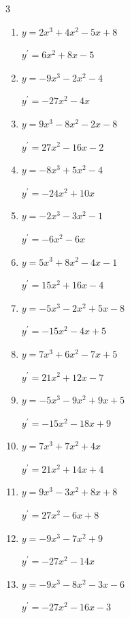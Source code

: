 \begin{multicols}{3}
\begin{enumerate}
  \item $y=2x^{3}+4x^{2}-5x+8$

        $\displaystyle y^{\prime}=6x^{2}+8x-5$

  \item $y=-9x^{3}-2x^{2}-4$

        $\displaystyle y^{\prime}=-27x^{2}-4x$

  \item $y=9x^{3}-8x^{2}-2x-8$

        $\displaystyle y^{\prime}=27x^{2}-16x-2$

  \item $y=-8x^{3}+5x^{2}-4$

        $\displaystyle y^{\prime}=-24x^{2}+10x$

  \item $y=-2x^{3}-3x^{2}-1$

        $\displaystyle y^{\prime}=-6x^{2}-6x$

  \item $y=5x^{3}+8x^{2}-4x-1$

        $\displaystyle y^{\prime}=15x^{2}+16x-4$

  \item $y=-5x^{3}-2x^{2}+5x-8$

        $\displaystyle y^{\prime}=-15x^{2}-4x+5$

  \item $y=7x^{3}+6x^{2}-7x+5$

        $\displaystyle y^{\prime}=21x^{2}+12x-7$

\columnbreak %

  \item $y=-5x^{3}-9x^{2}+9x+5$

        $\displaystyle y^{\prime}=-15x^{2}-18x+9$

  \item $y=7x^{3}+7x^{2}+4x$

        $\displaystyle y^{\prime}=21x^{2}+14x+4$

  \item $y=9x^{3}-3x^{2}+8x+8$

        $\displaystyle y^{\prime}=27x^{2}-6x+8$

  \item $y=-9x^{3}-7x^{2}+9$

        $\displaystyle y^{\prime}=-27x^{2}-14x$

  \item $y=-9x^{3}-8x^{2}-3x-6$

        $\displaystyle y^{\prime}=-27x^{2}-16x-3$


\end{enumerate}
\end{multicols}
